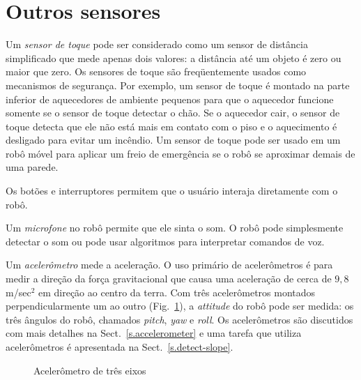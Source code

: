 \section{Outros sensores}\label{s.other-sensors}

Um \emph{sensor de toque} pode ser considerado como um sensor de distância simplificado que mede apenas dois valores: a distância até um objeto é zero ou maior que zero. Os sensores de toque são freqüentemente usados como mecanismos de segurança. Por exemplo, um sensor de toque é montado na parte inferior de aquecedores de ambiente pequenos para que o aquecedor funcione somente se o sensor de toque detectar o chão. Se o aquecedor cair, o sensor de toque detecta que ele não está mais em contato com o piso e o aquecimento é desligado para evitar um incêndio. Um sensor de toque pode ser usado em um robô móvel para aplicar um freio de emergência se o robô se aproximar demais de uma parede.

Os botões e interruptores permitem que o usuário interaja diretamente com o robô.

Um \emph{microfone} no robô permite que ele sinta o som. O robô pode simplesmente detectar o som ou pode usar algoritmos para interpretar comandos de voz.

Um \emph{acelerômetro} mede a aceleração. O uso primário de acelerômetros é para medir a direção da força gravitacional que causa uma aceleração de cerca de $9,8$ m/sec$^{2}$ em direção ao centro da terra. Com três acelerômetros montados perpendicularmente um ao outro (Fig.~\ref{fig.accel}), a \emph{attitude} do robô pode ser medida: os três ângulos do robô, chamados \emph{pitch}, \emph{yaw} e \emph{roll}. Os acelerômetros são discutidos com mais detalhes na Sect.~\ref{s.accelerometer} e uma tarefa que utiliza acelerômetros é apresentada na Sect.~\ref{s.detect-slope}.

\begin{figure}
\begin{center}
\caption{Acelerômetro de três eixos}\label{fig.accel}
\end{center}
\end{figure}

